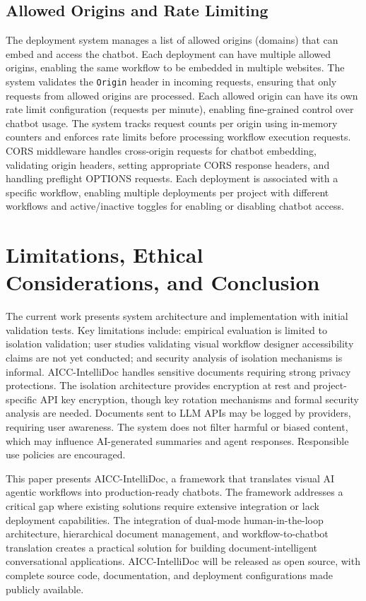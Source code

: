 \documentclass[11pt]{article}
\begin{document}
\subsection{Allowed Origins and Rate Limiting}

The deployment system manages a list of allowed origins (domains) that can embed and access the chatbot. Each deployment can have multiple allowed origins, enabling the same workflow to be embedded in multiple websites. The system validates the \texttt{Origin} header in incoming requests, ensuring that only requests from allowed origins are processed. Each allowed origin can have its own rate limit configuration (requests per minute), enabling fine-grained control over chatbot usage. The system tracks request counts per origin using in-memory counters and enforces rate limits before processing workflow execution requests. CORS middleware handles cross-origin requests for chatbot embedding, validating origin headers, setting appropriate CORS response headers, and handling preflight OPTIONS requests. Each deployment is associated with a specific workflow, enabling multiple deployments per project with different workflows and active/inactive toggles for enabling or disabling chatbot access.

\section{Limitations, Ethical Considerations, and Conclusion}

The current work presents system architecture and implementation with initial validation tests. Key limitations include: empirical evaluation is limited to isolation validation; user studies validating visual workflow designer accessibility claims are not yet conducted; and security analysis of isolation mechanisms is informal. AICC-IntelliDoc handles sensitive documents requiring strong privacy protections. The isolation architecture provides encryption at rest and project-specific API key encryption, though key rotation mechanisms and formal security analysis are needed. Documents sent to LLM APIs may be logged by providers, requiring user awareness. The system does not filter harmful or biased content, which may influence AI-generated summaries and agent responses. Responsible use policies are encouraged.

This paper presents AICC-IntelliDoc, a framework that translates visual AI agentic workflows into production-ready chatbots. The framework addresses a critical gap where existing solutions require extensive integration or lack deployment capabilities. The integration of dual-mode human-in-the-loop architecture, hierarchical document management, and workflow-to-chatbot translation creates a practical solution for building document-intelligent conversational applications. AICC-IntelliDoc will be released as open source, with complete source code, documentation, and deployment configurations made publicly available.
\end{document}
